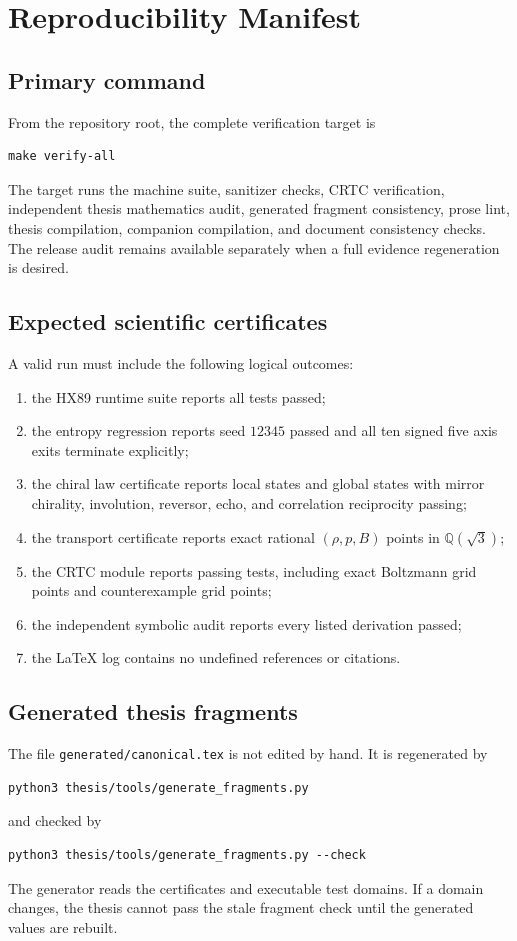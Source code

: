 \chapter{Reproducibility Manifest}\label{app:repro}

\section{Primary command}
From the repository root, the complete verification target is
\begin{lstlisting}
make verify-all
\end{lstlisting}
The target runs the machine suite, sanitizer checks, CRTC verification, independent thesis mathematics audit, generated fragment consistency, prose lint, thesis compilation, companion compilation, and document consistency checks. The release audit remains available separately when a full evidence regeneration is desired.

\section{Expected scientific certificates}
A valid run must include the following logical outcomes:
\begin{enumerate}[label=\arabic*.]
\item the HX89 runtime suite reports all tests passed;
\item the entropy regression reports seed $12345$ passed and all ten signed five axis exits terminate explicitly;
\item the chiral law certificate reports \HXLocalStates{} local states and \HXGlobalStates{} global states with mirror chirality, involution, reversor, echo, and correlation reciprocity passing;
\item the transport certificate reports \HXTransportGridPoints{} exact rational $(\rho,p,B)$ points in $\mathbb{Q}(\sqrt3)$;
\item the CRTC module reports \CRTCUnitTests{} passing tests, including \CRTCBoltzmannGridPoints{} exact Boltzmann grid points and \CRTCCounterGridPoints{} counterexample grid points;
\item the independent symbolic audit reports every listed derivation passed;
\item the LaTeX log contains no undefined references or citations.
\end{enumerate}

\section{Generated thesis fragments}
The file \texttt{generated/canonical.tex} is not edited by hand. It is regenerated by
\begin{lstlisting}
python3 thesis/tools/generate_fragments.py
\end{lstlisting}
and checked by
\begin{lstlisting}
python3 thesis/tools/generate_fragments.py --check
\end{lstlisting}
The generator reads the certificates and executable test domains. If a domain changes, the thesis cannot pass the stale fragment check until the generated values are rebuilt.


